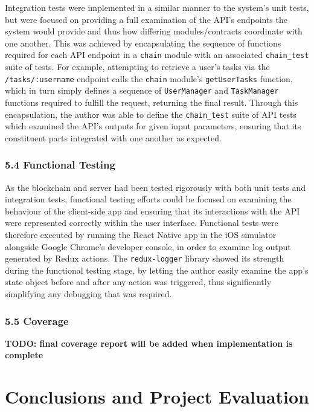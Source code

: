 \documentclass[12pt]{report}
\begin{document}
Integration tests were implemented in a similar manner to the system's
unit tests, but were focused on providing a full examination of the
API's endpoints the system would provide and thus how differing
modules/contracts coordinate with one another. This was achieved by
encapsulating the sequence of functions required for each API endpoint
in a \texttt{chain} module with an associated \texttt{chain\_test} suite
of tests. For example, attempting to retrieve a user's tasks via the
\texttt{/tasks/:username} endpoint calls the \texttt{chain} module's
\texttt{getUserTasks} function, which in turn simply defines a sequence
of \texttt{UserManager} and \texttt{TaskManager} functions required to
fulfill the request, returning the final result. Through this
encapsulation, the author was able to define the \texttt{chain\_test}
suite of API tests which examined the API's outputs for given input
parameters, ensuring that its constituent parts integrated with one
another as expected.

\subsection{5.4 Functional Testing}\label{functional-testing}

As the blockchain and server had been tested rigorously with both unit
tests and integration tests, functional testing efforts could be focused
on examining the behaviour of the client-side app and ensuring that its
interactions with the API were represented correctly within the user
interface. Functional tests were therefore executed by running the React
Native app in the iOS simulator alongside Google Chrome's developer
console, in order to examine log output generated by Redux actions. The
\texttt{redux-logger} library showed its strength during the functional
testing stage, by letting the author easily examine the app's state
object before and after any action was triggered, thus significantly
simplifying any debugging that was required.

\subsection{5.5 Coverage}\label{coverage}

\textbf{TODO: final coverage report will be added when implementation is
complete}

\chapter{Conclusions and Project
Evaluation}
\end{document}
